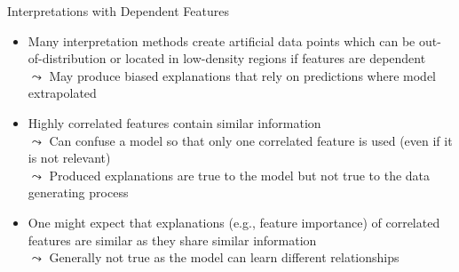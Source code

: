 \documentclass[11pt,compress,t,notes=noshow, aspectratio=169, xcolor=table]{beamer}
\begin{document}
\begin{frame}{Interpretations with Dependent Features}
\begin{itemize}
\item Many interpretation methods create
artificial data points which can be out-of-distribution or located in low-density regions if features are dependent\\
$\leadsto$ May produce biased explanations that rely on predictions where model extrapolated

\pause
\item Highly correlated features contain similar information \\
$\leadsto$ Can confuse a model so that only one correlated feature is used (even if it is not relevant) \\
$\leadsto$ Produced explanations are true to the model but not true to the data generating process

\pause
\item One might expect that explanations (e.g., feature importance) of correlated features are similar as they share similar information \\
$\leadsto$ Generally not true as the model can learn different relationships
\end{itemize}
\end{frame}



%
\end{document}
